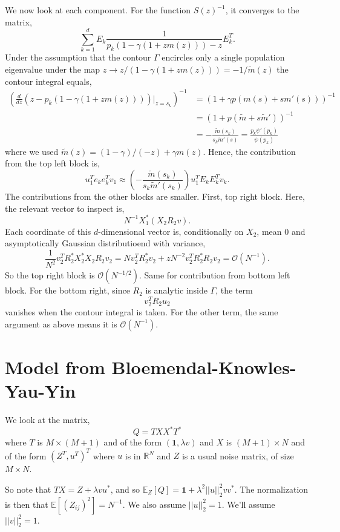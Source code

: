 \documentclass[11 pt, reqno]{article}
\def\beq{\begin{equation}}
\def\eeq{\end{equation}}
\def\rr{\mathbb{R}}
\def\1{\boldsymbol{1}}
\def\ee{\mathrm{E}}
\def\O{\mathcal{O}}
\def\ee{\mathbb{E}}
\begin{document}
We now look at each component.  For the function $S(z)^{-1}$, it converges to the matrix,
\beq
\sum_{k=1}^d E_k \frac{1}{ p_k(1 - \gamma (1 +z m(z) ) ) - z } E_k^T.
\eeq
Under the assumption that the contour $\Gamma$ encircles only a single population eigenvalue under the map $z \to z / ( 1 - \gamma (1 + z m (z) ) ) = - 1 / \tilde{m} (z) $ the contour integral equals,
\begin{align}
\left( \frac{d}{dz} (z - p_k (1 - \gamma (1+ zm(z) ) )) \bigg\vert_{z = s_k } \right)^{-1} &=\left( 1 + \gamma p (m(s) + s m' (s) ) \right)^{-1} \\
&= \left( 1 + p ( \tilde{m} + s \tilde{m}' ) \right)^{-1} \\
& = - \frac{ \tilde{m} (s_k ) }{ s_k \tilde{m}' (s) } =  \frac{ p_k \psi' ( p_k ) }{ \psi ( p_k ) }
\end{align}
where we used $\tilde{m} (z) = (1-\gamma ) / (-z) + \gamma m (z)$.  Hence, the contribution from the top left block is,
\beq
u_1^T e_k e_k^T v_1 \approx \left( - \frac{ \tilde{m} (s_k ) }{ s_k \tilde{m}' ( s_k ) } \right) u_1^T E_k E_k^T v_k.
\eeq
The contributions from the other blocks are smaller.  First, top right block.  Here, the relevant vector to inspect is,
\beq
N^{-1} X_1^* ( X_2 R_2 v).
\eeq
Each coordinate of this $d$-dimensional vector is, conditionally on $X_2$, mean $0$ and asymptotically Gaussian distributioend with variance,
\beq
\frac{1}{N^2} v_2^T R^*_2 X_2^*X_2 R_2 v_2 = N v_2^T R_2^* v_2 + z N^{-2} v_2^T R_2^* R_2 v_2 = \O (N^{-1} ).
\eeq
So the top right block is $\O(N^{-1/2})$.  Same for contribution from bottom left block.  For the bottom right, since $R_2$ is analytic inside $\Gamma$, the term
\beq
v_2^T R_2 u_2
\eeq
vanishes when the contour integral is taken.  For the other term, the same argument as above means it is $\O (N^{-1})$.  



\section{Model from Bloemendal-Knowles-Yau-Yin}





We look at the matrix, 
\beq
Q = T X X^* T^*
\eeq
where $T$ is $M \times (M+1)$ and of the form $( \1, \lambda v)$ and $X$ is $(M+1) \times N$ and of the form $(Z^T, u^T)^T$ where $u$ is in $\rr^N$ and $Z$ is a usual noise matrix, of size $M \times N$.  

So note that $TX = Z + \lambda v u^*$, and so $\ee_Z [ Q ] = \1 + \lambda^2 ||u||_2^2 v v^*$.    The normalization is then that $\ee[ (Z_{ij})^2] = N^{-1}$.  We also assume $||u||_2^2 = 1$.  We'll assume $||v||_2^2 = 1$.    
\end{document}
